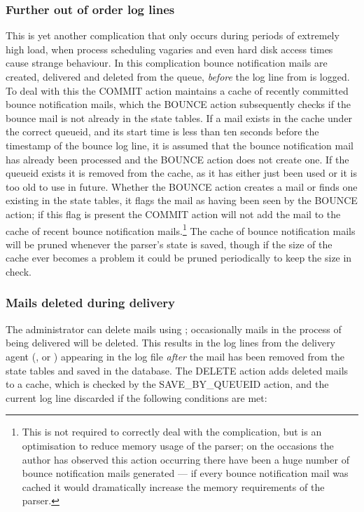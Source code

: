 \subsubsection{Further out of order log lines}

\label{Further out of order log lines}

This is yet another complication that only occurs during periods of
extremely high load, when process scheduling vagaries and even hard disk
access times cause strange behaviour.  In this complication bounce
notification mails are created, delivered and deleted from the queue,
\textit{before\/} the log line from  is logged.  To deal
with this the COMMIT action maintains a cache of recently committed bounce
notification mails, which the BOUNCE action subsequently checks if the
bounce mail is not already in the state tables. If a mail exists in the
cache under the correct queueid, and its start time is less than ten
seconds before the timestamp of the bounce log line, it is assumed that the
bounce notification mail has already been processed and the BOUNCE action
does not create one.  If the queueid exists it is removed from the cache,
as it has either just been used or it is too old to use in future.  Whether
the BOUNCE action creates a mail or finds one existing in the state tables,
it flags the mail as having been seen by the BOUNCE action; if this flag is
present the COMMIT action will not add the mail to the cache of recent
bounce notification mails.\footnote{This is not required to correctly deal
with the complication, but is an optimisation to reduce memory usage of the
parser; on the occasions the author has observed this action occurring
there have been a huge number of bounce notification mails generated --- if
every bounce notification mail was cached it would dramatically increase
the memory requirements of the parser.}  The cache of bounce notification
mails will be pruned whenever the parser's state is saved, though if the
size of the cache ever becomes a problem it could be pruned periodically to
keep the size in check.

\subsubsection{Mails deleted during delivery}

\label{Mails deleted during delivery}

The administrator can delete mails using ; occasionally
mails in the process of being delivered will be deleted.  This results in
the log lines from the delivery agent (,  or
) appearing in the log file \textit{after\/} the mail has been
removed from the state tables and saved in the database.  The DELETE action
adds deleted mails to a cache, which is checked by the SAVE\_BY\_QUEUEID
action, and the current log line discarded if the following conditions are
met:

